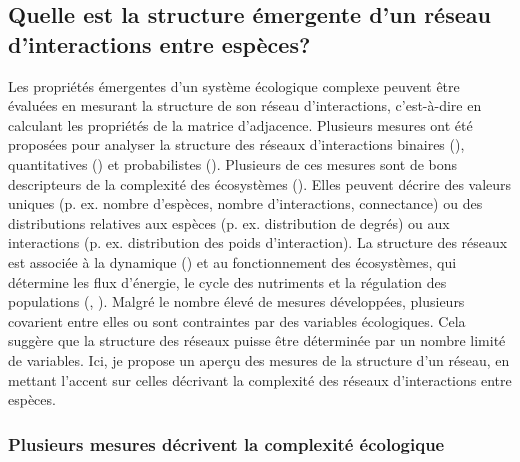 \subsection{Quelle est la structure émergente d'un réseau d'interactions entre espèces?} 

Les propriétés émergentes d'un système écologique complexe peuvent être évaluées
en mesurant la structure de son réseau d'interactions, c'est-à-dire en calculant
les propriétés de la matrice d'adjacence. Plusieurs mesures ont été proposées
pour analyser la structure des réseaux d'interactions binaires
(\cite{Delmas2019Analysing}), quantitatives (\cite{Bersier2002Quantitative}) et
probabilistes (\cite{Poisot2016Structure}). Plusieurs de ces mesures sont de
bons descripteurs de la complexité des écosystèmes (\cite{Landi2018Complexity}).
Elles peuvent décrire des valeurs uniques (p. ex. nombre d'espèces, nombre
d'interactions, connectance) ou des distributions relatives aux espèces (p. ex.
distribution de degrés) ou aux interactions (p. ex. distribution des poids
d'interaction). La structure des réseaux est associée à la dynamique
(\cite{Pascual2006Ecologicala}) et au fonctionnement des écosystèmes, qui
détermine les flux d'énergie, le cycle des nutriments et la régulation des
populations (\cite{McCann2011Food}, \cite{Thompson2012Food}). Malgré le nombre
élevé de mesures développées, plusieurs covarient entre elles ou sont
contraintes par des variables écologiques. Cela suggère que la structure des
réseaux puisse être déterminée par un nombre limité de variables. Ici, je
propose un aperçu des mesures de la structure d'un réseau, en mettant l'accent
sur celles décrivant la complexité des réseaux d'interactions entre espèces. 

\subsubsection{Plusieurs mesures décrivent la complexité écologique} 

